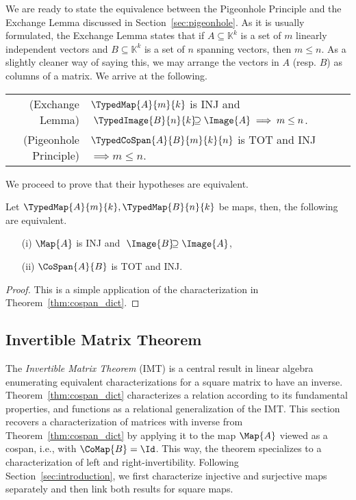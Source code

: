 \documentclass[manyauthors]{fundam}
\def\K{\mathbb{K}}
\begin{document}
We are ready to state the equivalence between the Pigeonhole Principle and the Exchange Lemma discussed in Section~\ref{sec:pigeonhole}. As it is usually formulated, the Exchange Lemma states that if $A \subseteq \K^k$ is a set of $m$ linearly independent vectors and $B \subseteq \K^k$ is a set of $n$ spanning vectors, then $m \leq n$. As a slightly cleaner way of saying this, we may arrange the vectors in $A$ (resp. $B$) as columns of a matrix. We arrive at the following.
\begin{center}
\renewcommand{\arraystretch}{2.0}
\begin{tabular}{r l}
    (Exchange Lemma) &$\TypedMap{A}{m}{k}$ is INJ and $\;\TypedImage{B}{n}{k}\!\!\! \supseteq \Image{A} \implies m \leq n$. \\
    (Pigeonhole Principle) &$\TypedCoSpan{A}{B}{m}{k}{n}$ is TOT and INJ $ \implies m \leq n$.
\end{tabular}
\end{center}
We proceed to prove that their hypotheses are equivalent.
\begin{proposition}
Let $\TypedMap{A}{m}{k}, \TypedMap{B}{n}{k}$ be maps, then, the following are equivalent.
\begin{enumerate}
    \item[(i)] $\Map{A}$ is INJ and $\;\Image{B} \!\!\!\supseteq \Image{A}$,
    \item[(ii)] $\CoSpan{A}{B}$ is TOT and INJ.
\end{enumerate}
\end{proposition}
\begin{proof} This is a simple application of the characterization in Theorem~\ref{thm:cospan_dict}.
\end{proof}


\subsection{Invertible Matrix Theorem}
\label{sec:applications_invertible_matrix_theorem}

The \emph{Invertible Matrix Theorem} (IMT) is a central result in linear algebra
enumerating equivalent characterizations for a square matrix to have an inverse.
Theorem~\ref{thm:cospan_dict} characterizes a relation according to its fundamental properties,
and functions as a relational generalization of the IMT.
This section recovers a characterization of matrices with inverse
from Theorem~\ref{thm:cospan_dict} by applying it to the map $\Map{A}$
viewed as a cospan, i.e., with $\CoMap{B} = \Id$.
This way, the theorem specializes to a characterization of left and right-invertibility.
Following Section~\ref{sec:introduction},
we first characterize injective and surjective maps separately
and then link both results for square maps.
\end{document}
